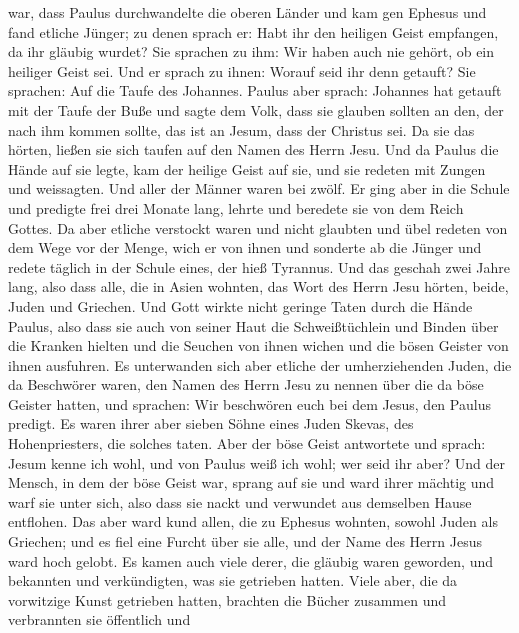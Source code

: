 war, dass Paulus durchwandelte die oberen Länder und kam gen Ephesus und
fand etliche Jünger;  zu denen sprach er: Habt ihr den
heiligen Geist empfangen, da ihr gläubig wurdet? Sie sprachen zu ihm:
Wir haben auch nie gehört, ob ein heiliger Geist sei.  Und
er sprach zu ihnen: Worauf seid ihr denn getauft? Sie sprachen: Auf die
Taufe des Johannes.  Paulus aber sprach: Johannes hat
getauft mit der Taufe der Buße und sagte dem Volk, dass sie glauben
sollten an den, der nach ihm kommen sollte, das ist an Jesum, dass der
Christus sei.  Da sie das hörten, ließen sie sich taufen auf
den Namen des Herrn Jesu.  Und da Paulus die Hände auf sie
legte, kam der heilige Geist auf sie, und sie redeten mit Zungen und
weissagten.  Und aller der Männer waren bei zwölf.
 Er ging aber in die Schule und predigte frei drei Monate
lang, lehrte und beredete sie von dem Reich Gottes.  Da aber
etliche verstockt waren und nicht glaubten und übel redeten von dem Wege
vor der Menge, wich er von ihnen und sonderte ab die Jünger und redete
täglich in der Schule eines, der hieß Tyrannus.  Und das
geschah zwei Jahre lang, also dass alle, die in Asien wohnten, das Wort
des Herrn Jesu hörten, beide, Juden und Griechen.  Und Gott
wirkte nicht geringe Taten durch die Hände Paulus,  also
dass sie auch von seiner Haut die Schweißtüchlein und Binden über die
Kranken hielten und die Seuchen von ihnen wichen und die bösen Geister
von ihnen ausfuhren.  Es unterwanden sich aber etliche der
umherziehenden Juden, die da Beschwörer waren, den Namen des Herrn Jesu
zu nennen über die da böse Geister hatten, und sprachen: Wir beschwören
euch bei dem Jesus, den Paulus predigt.  Es waren ihrer
aber sieben Söhne eines Juden Skevas, des Hohenpriesters, die solches
taten.  Aber der böse Geist antwortete und sprach: Jesum
kenne ich wohl, und von Paulus weiß ich wohl; wer seid ihr aber?
 Und der Mensch, in dem der böse Geist war, sprang auf sie
und ward ihrer mächtig und warf sie unter sich, also dass sie nackt und
verwundet aus demselben Hause entflohen.  Das aber ward
kund allen, die zu Ephesus wohnten, sowohl Juden als Griechen; und es
fiel eine Furcht über sie alle, und der Name des Herrn Jesus ward hoch
gelobt.  Es kamen auch viele derer, die gläubig waren
geworden, und bekannten und verkündigten, was sie getrieben hatten.
 Viele aber, die da vorwitzige Kunst getrieben hatten,
brachten die Bücher zusammen und verbrannten sie öffentlich und
